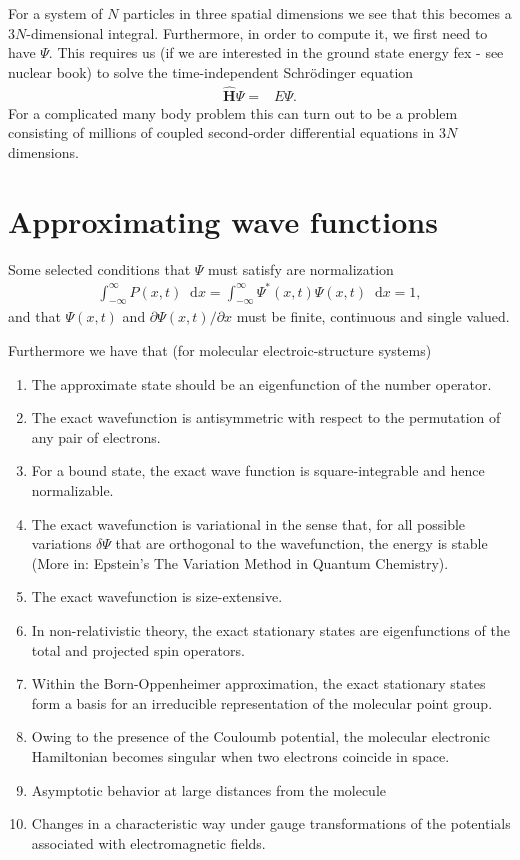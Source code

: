 \documentclass[twoside,english]{uiofysmaster}
\newcommand*\dif{\mathop{}\!\mathrm{d}}
\begin{document}
For a system of $N$ particles in three spatial dimensions we see that
this becomes a $3N$-dimensional integral. Furthermore, in order to
compute it, we first need to have $\Psi$. This requires us (if we are
interested in the ground state energy fex - see nuclear book) to solve
the time-independent Schrödinger equation
\begin{align}
	\hat{\bm{H}} \Psi =& E\Psi .
\end{align}
For a complicated many body problem this can turn out to be a problem
consisting of millions of coupled second-order differential equations
in $3N$ dimensions.


\section{Approximating wave functions}
Some selected conditions that $\Psi$ must satisfy \cite{HjortJensen2015} are normalization 
\begin{align}
	\int_{-\infty}^{\infty} P(x,t) \dif x = \int_{-\infty}^{\infty} \Psi^{\ast}(x,t) \Psi (x,t) \dif x = 1,
\end{align}
and that $\Psi (x,t)$ and $\partial \Psi(x,t) / \partial x$ must be finite, continuous and single valued.

Furthermore we have that \cite{Helgaker2000} (for molecular electroic-structure systems)
\begin{enumerate}
	\item The approximate state should be an eigenfunction of the number operator.
	\item The exact wavefunction is antisymmetric with respect to the permutation of any pair of electrons.
	\item For a bound state, the exact wave function is square-integrable and hence normalizable.
	\item The exact wavefunction is variational in the sense that, for all possible variations $\delta \Psi$ that are orthogonal to the wavefunction, the energy is stable (More in: Epstein's The Variation Method in Quantum Chemistry).
	\item The exact wavefunction is size-extensive. 
	\item In non-relativistic theory, the exact stationary states are eigenfunctions of the total and projected spin operators.
	\item Within the Born-Oppenheimer approximation, the exact stationary states form a basis for an irreducible representation of the molecular point group. 
	\item Owing to the presence of the Couloumb potential, the molecular electronic Hamiltonian becomes singular when two electrons coincide in space.
	\item Asymptotic behavior at large distances from the molecule
	\item Changes in a characteristic way under gauge transformations of the potentials associated with electromagnetic fields.
\end{enumerate}
\end{document}
